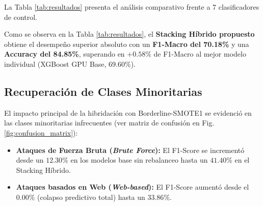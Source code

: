 \documentclass[conference]{IEEEtran}
\begin{document}
La Tabla \ref{tab:resultados} presenta el análisis comparativo frente a 7 clasificadores de control.

\begin{table}[htbp]
\caption{Comparativa de Desempeño sobre el Test Set Aislado ($N=377,383$)}
\label{tab:resultados}
\centering
{}
\end{table}

Como se observa en la Tabla \ref{tab:resultados}, el \textbf{Stacking Híbrido propuesto} obtiene el desempeño superior absoluto con un \textbf{F1-Macro del 70.18\%} y una \textbf{Accuracy del 84.85\%}, superando en $+0.58\%$ de F1-Macro al mejor modelo individual (XGBoost GPU Base, 69.60\%).

\subsection{Recuperación de Clases Minoritarias}
El impacto principal de la hibridación con Borderline-SMOTE1 se evidenció en las clases minoritarias infrecuentes (ver matriz de confusión en Fig. \ref{fig:confusion_matrix}):
\begin{itemize}
    \item \textbf{Ataques de Fuerza Bruta (\textit{Brute Force}):} El F1-Score se incrementó desde un $12.30\%$ en los modelos base sin rebalanceo hasta un \textbf{$41.40\%$} en el Stacking Híbrido.
    \item \textbf{Ataques basados en Web (\textit{Web-based}):} El F1-Score aumentó desde el $0.00\%$ (colapso predictivo total) hasta un \textbf{$33.86\%$}.
\end{itemize}
\end{document}
